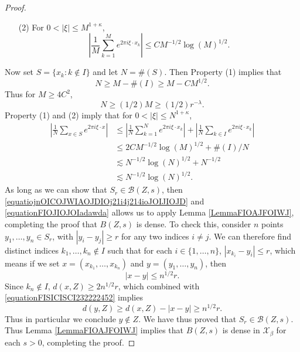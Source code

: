 \documentclass[dvipsnames,letterpaper,12pt]{article}
\numberwithin{equation}{section}
\numberwithin{theorem}{section}
\begin{document}
\begin{proof}
\begin{itemize}
        \item[(2)] For $0 < |\xi| \leq M^{1 + \kappa}$,
        \[ \left| \frac{1}{M} \sum_{k = 1}^M e^{2 \pi i \xi \cdot x_k} \right| \leq C M^{-1/2} \log(M)^{1/2}. \]
    \end{itemize}
    Now set $S = \{ x_k : k \not \in I \}$ and let $N = \#(S)$. Then Property (1) implies that
    \begin{equation}
        N \geq M - \#(I) \geq M - C M^{1/2}.
    \end{equation}
    Thus for $M \geq 4C^2$,
    \begin{equation} \label{equatiojnOICOJWIAOJDIOj21i4j214ioJOIJIOJD}
        N \geq (1/2) M \geq (1/2) r^{-\lambda}.
    \end{equation}
    Property (1) and (2) imply that for $0 < |\xi| \leq N^{1 + \kappa}$,
    \begin{equation} \label{equationFIOJIOJOIadawda}
    \begin{split}
        \left| \frac{1}{N} \sum_{x \in S} e^{2 \pi i \xi \cdot x} \right| &\leq \left| \frac{1}{N} \sum_{k = 1}^N e^{2 \pi i \xi \cdot x_k} \right| + \left| \frac{1}{N} \sum_{k \in I} e^{2 \pi i \xi \cdot x_k} \right|\\
        &\leq 2C M^{-1/2} \log(M)^{1/2} + \#(I)/N \\
        &\lesssim N^{-1/2} \log(N)^{1/2} + N^{-1/2}\\
        &\lesssim N^{-1/2} \log(N)^{1/2}.
    \end{split}
    \end{equation}
    As long as we can show that $S_r \in \mathcal{B}(Z,s)$, then \eqref{equatiojnOICOJWIAOJDIOj21i4j214ioJOIJIOJD} and \eqref{equationFIOJIOJOIadawda} allows us to apply Lemma \ref{LemmaFIOAJFOIWJ}, completing the proof that $B(Z,s)$ is dense. To check this, consider $n$ points $y_1,\dots,y_n \in S_r$, with $|y_i - y_j| \geq r$ for any two indices $i \neq j$. We can therefore find distinct indices $k_1, \dots, k_n \not \in I$ such that for each $i \in \{ 1, \dots, n \}$, $|x_{k_i} - y_i| \leq r$, which means if we set $x = (x_{k_1}, \dots, x_{k_n})$ and $y = (y_1, \dots, y_n)$, then
    \begin{equation} \label{equationFISICISCI232222452}
        |x - y| \leq n^{1/2} r.
    \end{equation}
    Since $k_n \not \in I$, $d(x,Z) \geq 2n^{1/2}r$, which combined with \eqref{equationFISICISCI232222452} implies
    \begin{equation} \label{equationSICSICI}
        d(y,Z) \geq d(x,Z) - |x - y| \geq n^{1/2} r.
    \end{equation}
    Thus in particular we conclude $y \not \in Z$. We have thus proved that $S_r \in \mathcal{B}(Z,s)$. Thus Lemma \ref{LemmaFIOAJFOIWJ} implies that $B(Z,s)$ is dense in $\mathcal{X}_\beta$ for each $s > 0$, completing the proof.
\end{proof}
\end{document}

